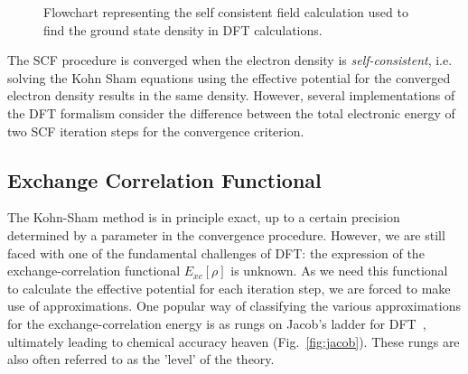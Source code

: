 \begin{refsection}
\begin{figure}[!h]
\caption{\label{fig:SCF} Flowchart representing the self consistent field calculation used to find the ground state density in DFT calculations.}
\end{figure}

The SCF procedure is converged when the electron density is \textit{self-consistent}, i.e. solving the Kohn Sham equations using the effective potential for the converged electron density results in the same density. However, several implementations of the DFT formalism consider the difference between the total electronic energy of two SCF iteration steps for the convergence criterion.

\subsection{Exchange Correlation Functional} \label{dft:sec-functionals}

The Kohn-Sham method is in principle exact, up to a certain precision determined by a parameter in the convergence procedure. However, we are still faced with one of the fundamental challenges of DFT: the expression of the exchange-correlation functional $E_{xc}[\rho]$ is unknown. As we need this functional to calculate the effective potential for each iteration step, we are forced to make use of approximations. One popular way of classifying the various approximations for the exchange-correlation energy is as rungs on Jacob's ladder for DFT~\cite{Perdew2001}, ultimately leading to chemical accuracy heaven (Fig.~\ref{fig:jacob}). These rungs are also often referred to as the 'level' of the theory.


\end{refsection}
